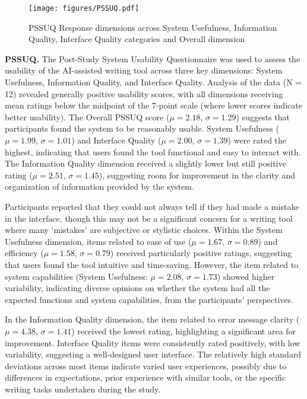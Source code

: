 \begin{figure}[!t]
  \centering
  \texttt{[image: figures/PSSUQ.pdf]}
  \caption{PSSUQ Response dimensions across System Usefulness, Information Quality, Interface Quality categories and Overall dimension}
  \label{fig:pssuq}
\end{figure}
\textbf{PSSUQ.} The Post-Study System Usability Questionnaire was used to assess the usability of the AI-assisted writing tool across three key dimensions: System Usefulness, Information Quality, and Interface Quality. Analysis of the data (N = 12) revealed generally positive usability scores, with all dimensions receiving mean ratings below the midpoint of the 7-point scale (where lower scores indicate better usability). The Overall PSSUQ score ($\mu = 2.18$, $\sigma = 1.29$) suggests that participants found the system to be reasonably usable. System Usefulness ($\mu = 1.99$, $\sigma = 1.01$) and Interface Quality ($\mu = 2.00$, $\sigma = 1.39$) were rated the highest, indicating that users found the tool functional and easy to interact with. The Information Quality dimension received a slightly lower but still positive rating ($\mu = 2.51$, $\sigma = 1.45$), suggesting room for improvement in the clarity and organization of information provided by the system.

%   

Participants reported that they could not always tell if they had made a mistake in the interface, though this may not be a significant concern for a writing tool where many `mistakes' are subjective or stylistic choices. Within the System Usefulness dimension, items related to ease of use ($\mu = 1.67$, $\sigma = 0.89$) and efficiency ($\mu = 1.58$, $\sigma = 0.79$) received particularly positive ratings, suggesting that users found the tool intuitive and time-saving. However, the item related to system capabilities (System Usefulness: $\mu = 2.08$, $\sigma = 1.73$) showed higher variability, indicating diverse opinions on whether the system had all the expected functions and system capabilities, from the participants' perspectives.

In the Information Quality dimension, the item related to error message clarity ($\mu = 4.38$, $\sigma = 1.41$) received the lowest rating, highlighting a significant area for improvement. Interface Quality items were consistently rated positively, with low variability, suggesting a well-designed user interface. The relatively high standard deviations across most items indicate varied user experiences, possibly due to differences in expectations, prior experience with similar tools, or the specific writing tasks undertaken during the study.

